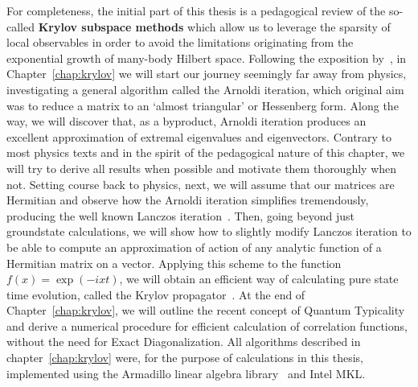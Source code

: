 For completeness, the initial part of this thesis is a pedagogical review of the so-called
\textbf{Krylov subspace methods} which allow us to leverage the sparsity of local observables
in order to avoid the limitations originating from the exponential growth of many-body Hilbert space.
Following the exposition by~\textcite{Trefethen1997}, in Chapter~\ref{chap:krylov} we will start our journey seemingly far away from
physics, investigating a general algorithm called the Arnoldi iteration, which original aim was to reduce
a matrix to an `almost triangular' or Hessenberg form. Along the way, we will discover that, as a byproduct,
Arnoldi iteration produces an excellent approximation of extremal eigenvalues and eigenvectors. Contrary
to most physics texts and in the spirit of the pedagogical nature of this chapter, we will try to derive all results
when possible and motivate them thoroughly when not. Setting course back to physics, next, we will assume that our matrices are
Hermitian and observe how the Arnoldi iteration simplifies tremendously, producing the well known
Lanczos iteration~\autocite{Sandvik2010}. Then, going beyond just groundstate calculations, we will show how to slightly
modify Lanczos iteration to be able to compute an approximation of action of any analytic function of a Hermitian
matrix on a vector. Applying this scheme to the function \(f(x) = \exp\left(-i x t\right)\), we will obtain an efficient
way of calculating pure state time evolution, called the Krylov propagator~\autocite{Park1986}.
At the end of Chapter~\ref{chap:krylov}, we will outline the recent concept of Quantum Typicality~\autocite{Bartsch2009}
and derive a numerical procedure for efficient calculation of correlation functions, without the need for Exact
Diagonalization. All algorithms described in chapter~\ref{chap:krylov} were, for the purpose of calculations
in this thesis, implemented using
the Armadillo linear algebra library~\autocite{Sanderson2016} and Intel MKL.

